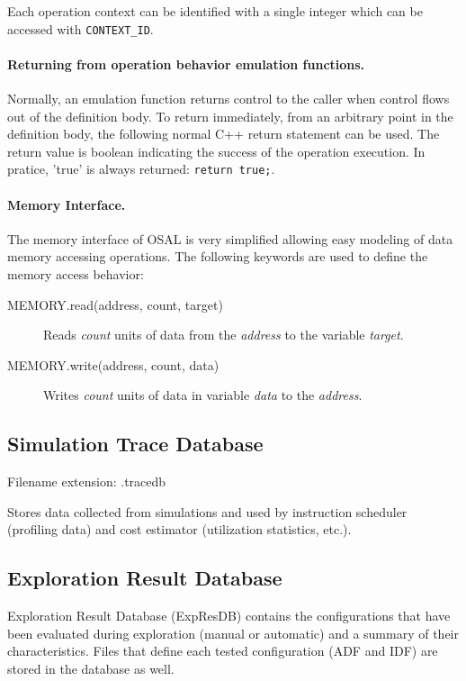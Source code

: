\documentclass[twoside]{tceusermanual}
\begin{document}
Each operation context can be identified with a single integer which
can be accessed with \verb#CONTEXT_ID#.

\paragraph{Returning from operation behavior emulation functions.}
Normally, an emulation function returns control to the caller when control
flows out of the definition body.  To return immediately, from an arbitrary
point in the definition body, the following normal C++ return 
statement can be used. The return value is boolean indicating the success
of the operation execution. In pratice, 'true' is always returned:
\verb|return true;|.

\paragraph{Memory Interface.}

The memory interface of OSAL is very simplified allowing easy modeling of
data memory accessing operations. The following keywords are used
to define the memory access behavior:

\begin{description}
\item[MEMORY.read(address, count, target)]%
  Reads \emph{count} units of data from the \emph{address} to the variable
  \emph{target}.
\item[MEMORY.write(address, count, data)]%
  Writes \emph{count} units of data in variable \emph{data} to 
  the \emph{address}.
\end{description}


\subsection{Simulation Trace Database}
\label{sec:tracedb}

Filename extension: .tracedb

Stores data collected from simulations and used by instruction scheduler
(profiling data) and cost estimator (utilization statistics, etc.).

\subsection{Exploration Result Database}
\label{sec:expresdb}

Exploration Result Database (ExpResDB) contains the configurations that have
been evaluated during exploration (manual or automatic) and a summary of
their characteristics. Files that define each tested configuration (ADF and
IDF) are stored in the database as well. 
\end{document}
